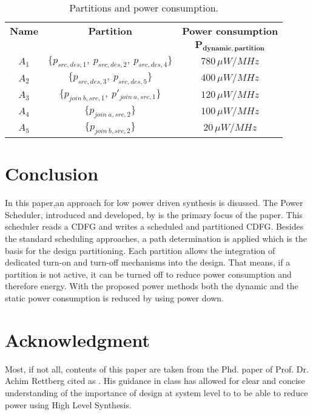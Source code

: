 \documentclass[conference]{IEEEtran}
\begin{document}
\begin{table}[h!]
\centering
\renewcommand{\arraystretch}{1.4}
\begin{tabular}{|c|c|c|}
\hline
\textbf{Name} & \textbf{Partition} & \textbf{Power consumption} \\
 & & $\boldsymbol{P_{dynamic, partition}}$ \\
\hline
$\mathit{A_1}$ & $\{\mathit{p_{src,des,1}},\ \mathit{p_{src,des,2}},\ \mathit{p_{src,des,4}}\}$ & $780\,\mu W/\mathit{MHz}$ \\
$\mathit{A_2}$ & $\{\mathit{p_{src,des,3}},\ \mathit{p_{src,des,5}}\}$ & $400\,\mu W/\mathit{MHz}$ \\
$\mathit{A_3}$ & $\{\mathit{p_{join\ b,src,1}},\ \mathit{p'_{join\ a,src,1}}\}$ & $120\,\mu W/\mathit{MHz}$ \\
$\mathit{A_4}$ & $\{\mathit{p_{join\ a,src,2}}\}$ & $100\,\mu W/\mathit{MHz}$ \\
$\mathit{A_5}$ & $\{\mathit{p_{join\ b,src,2}}\}$ & $20\,\mu W/\mathit{MHz}$ \\
\hline
\end{tabular}
\vspace{0.5em}
\caption{Partitions and power consumption.}
\end{table}



\section{Conclusion}
\label{sec: conclusion}
In this paper,an approach for low power driven synthesis is disussed. The Power Scheduler, introduced and developed, by \cite{Ret} is the primary focus of the paper. This scheduler reads a CDFG and writes a scheduled and partitioned CDFG. Besides the standard scheduling approaches, a path determination is applied which is the basis for the design partitioning. Each partition allows the integration of dedicated turn-on and turn-off mechanisms into the design. That means, if a partition is not active, it can be turned off to reduce power consumption and therefore energy. With the proposed power methods both the dynamic and the static power consumption is reduced by using power down. 
\section*{Acknowledgment}
Most, if not all, contents of this paper are taken from the Phd. paper of Prof. Dr. Achim Rettberg cited as \cite{Ret}. His guidance in class has allowed for clear and concise understanding of the importance of design at system level to to be able to reduce power using High Level Synthesis.



\printbibliography
\end{document}

